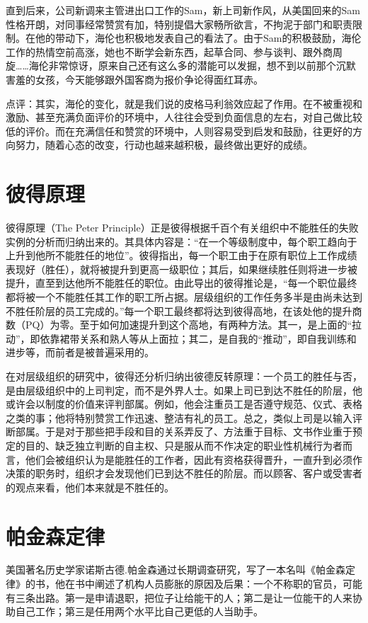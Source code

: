 \documentclass[11pt]{ctexart}
\begin{document}
直到后来，公司新调来主管进出口工作的Sam，新上司新作风，从美国回来的Sam性格开朗，对同事经常赞赏有加，特别提倡大家畅所欲言，不拘泥于部门和职责限制。在他的带动下，海伦也积极地发表自己的看法了。由于Sam的积极鼓励，海伦工作的热情空前高涨，她也不断学会新东西，起草合同、参与谈判、跟外商周旋……海伦非常惊讶，原来自己还有这么多的潜能可以发掘，想不到以前那个沉默害羞的女孩，今天能够跟外国客商为报价争论得面红耳赤。

点评：其实，海伦的变化，就是我们说的皮格马利翁效应起了作用。在不被重视和激励、甚至充满负面评价的环境中，人往往会受到负面信息的左右，对自己做比较低的评价。而在充满信任和赞赏的环境中，人则容易受到启发和鼓励，往更好的方向努力，随着心态的改变，行动也越来越积极，最终做出更好的成绩。
\section{彼得原理}
\label{sec-12}


彼得原理（The Peter Principle）正是彼得根据千百个有关组织中不能胜任的失败实例的分析而归纳出来的。其具体内容是：“在一个等级制度中，每个职工趋向于上升到他所不能胜任的地位”。彼得指出，每一个职工由于在原有职位上工作成绩表现好（胜任），就将被提升到更高一级职位；其后，如果继续胜任则将进一步被提升，直至到达他所不能胜任的职位。由此导出的彼得推论是，“每一个职位最终都将被一个不能胜任其工作的职工所占据。层级组织的工作任务多半是由尚未达到不胜任阶层的员工完成的。”每一个职工最终都将达到彼得高地，在该处他的提升商数（PQ）为零。至于如何加速提升到这个高地，有两种方法。其一，是上面的“拉动”，即依靠裙带关系和熟人等从上面拉；其二，是自我的“推动”，即自我训练和进步等，而前者是被普遍采用的。

在对层级组织的研究中，彼得还分析归纳出彼德反转原理：一个员工的胜任与否，是由层级组织中的上司判定，而不是外界人士。如果上司已到达不胜任的阶层，他或许会以制度的价值来评判部属。例如，他会注重员工是否遵守规范、仪式、表格之类的事；他将特别赞赏工作迅速、整洁有礼的员工。总之，类似上司是以输入评断部属。于是对于那些把手段和目的关系弄反了、方法重于目标、文书作业重于预定的目的、缺乏独立判断的自主权、只是服从而不作决定的职业性机械行为者而言，他们会被组织认为是能胜任的工作者，因此有资格获得晋升，一直升到必须作决策的职务时，组织才会发现他们已到达不胜任的阶层。而以顾客、客户或受害者的观点来看，他们本来就是不胜任的。
\section{帕金森定律}
\label{sec-13}


美国著名历史学家诺斯古德.帕金森通过长期调查研究，写了一本名叫《帕金森定律》的书，他在书中阐述了机构人员膨胀的原因及后果：一个不称职的官员，可能有三条出路。第一是申请退职，把位子让给能干的人；第二是让一位能干的人来协助自己工作；第三是任用两个水平比自己更低的人当助手。
\end{document}
